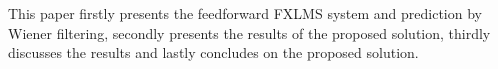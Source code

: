
This paper firstly presents the feedforward FXLMS system and prediction by Wiener filtering, secondly presents the results of the proposed solution, thirdly discusses the results and lastly concludes on the proposed solution.
        











